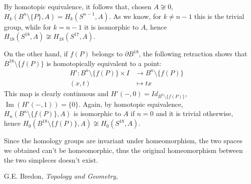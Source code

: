 \documentclass{article}
\DeclareMathOperator{\Ima}{Im}
\begin{document}
By homotopic equivalence, it follows that, chosen $A\not\cong 0$, $H_k(B^n\setminus\{P\},A)=H_k(S^{n-1},A)$. As we know, for $k\neq n-1$ this is the trivial group, while for $k=n-1$ it is isomorphic to $A$, hence $H_{18}(S^{18},A)\not\cong H_{18}(S^{17},A)$.

On the other hand, if $f(P)$ belongs to $\partial B^{18}$, the following retraction shows that $B^{18}\setminus\{f(P)\}$ is homotopically equivalent to a point:
\begin{align*}
		H':B^n\setminus\{f(P)\}\times I & \rightarrow B^n\setminus\{f(P)\} \\
		(x,t) & \mapsto tx
\end{align*}
This map is clearly continuous and $H'(-,0)=Id_{B^n\setminus\{f(P)\}}$, $\Ima(H'(-,1))=\{0\}$. Again, by homotopic equivalence, $H_n(B^n\setminus\{f(P)\},A)$ is isomorphic to $A$ if $n=0$ and it is trivial otherwise, hence $H_0(B^{18}\setminus\{f(P)\},A)\not\cong H_0(S^{18},A)$.

Since the homology groups are invariant under homeomorphism, the two spaces we obtained can't be homeomorphic, thus the original homeomorphism between the two simpleces doesn't exist.

\begin{thebibliography}{9}
				G.E. Bredon,
				\textit{Topology and Geometry},
\end{thebibliography}
\end{document}

